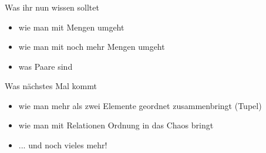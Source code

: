 


\begin{frame}
	\frametitle{}
	
	\begin{block}{Was ihr nun wissen solltet}
		\begin{itemize}
			\item wie man mit Mengen umgeht
			\item wie man mit noch mehr Mengen umgeht
			\item was Paare sind
		\end{itemize}
	\end{block}

	\begin{block}{Was nächstes Mal kommt}
		\begin{itemize}
			\item wie man mehr als zwei Elemente geordnet zusammenbringt (Tupel)
			\item wie man mit Relationen Ordnung in das Chaos bringt
			\item ... und noch vieles mehr!
		\end{itemize}
	\end{block}
\end{frame}


\slideThanks


